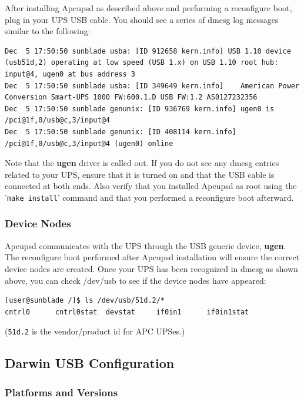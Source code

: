 After installing Apcupsd as described above and performing a reconfigure boot,
plug in your UPS USB cable. You should see a series of dmesg log messages similar
to the following: 

\begin{verbatim}
Dec  5 17:50:50 sunblade usba: [ID 912658 kern.info] USB 1.10 device (usb51d,2) operating at low speed (USB 1.x) on USB 1.10 root hub: input@4, ugen0 at bus address 3
Dec  5 17:50:50 sunblade usba: [ID 349649 kern.info]    American Power Conversion Smart-UPS 1000 FW:600.1.D USB FW:1.2 AS0127232356
Dec  5 17:50:50 sunblade genunix: [ID 936769 kern.info] ugen0 is /pci@1f,0/usb@c,3/input@4
Dec  5 17:50:50 sunblade genunix: [ID 408114 kern.info] /pci@1f,0/usb@c,3/input@4 (ugen0) online
\end{verbatim}

Note that the {\bf ugen} driver is called out. If you do not see any dmesg entries
related to your UPS, ensure that it is turned on and that the USB cable is connected
at both ends. Also verify that you installed Apcupsd as root using the 
'\texttt{make install}' command and that you performed a reconfigure boot afterward.

\subsubsection*{Device Nodes}

Apcupsd communicates with the UPS through the USB generic device, {\bf ugen}.
The reconfigure boot performed after Apcupsd installation will ensure the
correct device nodes are created. Once your UPS has been recognized in dmesg
as shown above, you can check /dev/usb to see if the device nodes have appeared:

\begin{verbatim}
[user@sunblade /]$ ls /dev/usb/51d.2/*
cntrl0      cntrl0stat  devstat     if0in1      if0in1stat
\end{verbatim}

(\texttt{51d.2} is the vendor/product id for APC UPSes.)


\subsection*{Darwin USB Configuration}

\subsubsection*{Platforms and Versions}

